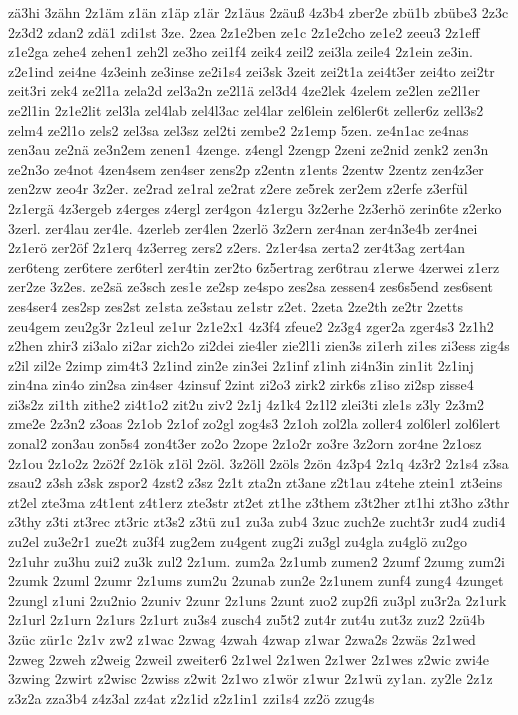 {zä3hi
3zähn
2z1äm
z1än
z1äp
z1är
2z1äus
2zäuß
4z3b4
zber2e
zbü1b
zbübe3
2z3c
2z3d2
zdan2
zdä1
zdi1st
3ze.
2zea
2z1e2ben
ze1c
2z1e2cho
ze1e2
zeeu3
2z1eff
z1e2ga
zehe4
zehen1
zeh2l
ze3ho
zei1f4
zeik4
zeil2
zei3la
zeile4
2z1ein
ze3in.
z2e1ind
zei4ne
4z3einh
ze3inse
ze2i1s4
zei3sk
3zeit
zei2t1a
zei4t3er
zei4to
zei2tr
zeit3ri
zek4
ze2l1a
zela2d
zel3a2n
ze2l1ä
zel3d4
4ze2lek
4zelem
ze2len
ze2l1er
ze2l1in
2z1e2lit
zel3la
zel4lab
zel4l3ac
zel4lar
zel6lein
zel6ler6t
zeller6z
zell3s2
zelm4
ze2l1o
zels2
zel3sa
zel3sz
zel2ti
zembe2
2z1emp
5zen.
ze4n1ac
ze4nas
zen3au
ze2nä
ze3n2em
zenen1
4zenge.
z4engl
2zengp
2zeni
ze2nid
zenk2
zen3n
ze2n3o
ze4not
4zen4sem
zen4ser
zens2p
z2entn
z1ents
2zentw
2zentz
zen4z3er
zen2zw
zeo4r
3z2er.
ze2rad
ze1ral
ze2rat
z2ere
ze5rek
zer2em
z2erfe
z3erfül
2z1ergä
4z3ergeb
z4erges
z4ergl
zer4gon
4z1ergu
3z2erhe
2z3erhö
zerin6te
z2erko
3zerl.
zer4lau
zer4le.
4zerleb
zer4len
2zerlö
3z2ern
zer4nan
zer4n3e4b
zer4nei
2z1erö
zer2öf
2z1erq
4z3erreg
zers2
z2ers.
2z1er4sa
zerta2
zer4t3ag
zert4an
zer6teng
zer6tere
zer6terl
zer4tin
zer2to
6z5ertrag
zer6trau
z1erwe
4zerwei
z1erz
zer2ze
3z2es.
ze2sä
ze3sch
zes1e
ze2sp
ze4spo
zes2sa
zessen4
zes6s5end
zes6sent
zes4ser4
zes2sp
zes2st
ze1sta
ze3stau
ze1str
z2et.
2zeta
2ze2th
ze2tr
2zetts
zeu4gem
zeu2g3r
2z1eul
ze1ur
2z1e2x1
4z3f4
zfeue2
2z3g4
zger2a
zger4s3
2z1h2
z2hen
zhir3
zi3alo
zi2ar
zich2o
zi2dei
zie4ler
zie2l1i
zien3s
zi1erh
zi1es
zi3ess
zig4s
z2il
zil2e
2zimp
zim4t3
2z1ind
zin2e
zin3ei
2z1inf
z1inh
zi4n3in
zin1it
2z1inj
zin4na
zin4o
zin2sa
zin4ser
4zinsuf
2zint
zi2o3
zirk2
zirk6s
z1iso
zi2sp
zisse4
zi3s2z
zi1th
zithe2
zi4t1o2
zit2u
ziv2
2z1j
4z1k4
2z1l2
zlei3ti
zle1s
z3ly
2z3m2
zme2e
2z3n2
z3oas
2z1ob
2z1of
zo2gl
zog4s3
2z1oh
zol2la
zoller4
zol6lerl
zol6lert
zonal2
zon3au
zon5s4
zon4t3er
zo2o
2zope
2z1o2r
zo3re
3z2orn
zor4ne
2z1osz
2z1ou
2z1o2z
2zö2f
2z1ök
z1öl
2zöl.
3z2öll
2zöls
2zön
4z3p4
2z1q
4z3r2
2z1s4
z3sa
zsau2
z3sh
z3sk
zspor2
4zst2
z3sz
2z1t
zta2n
zt3ane
z2t1au
z4tehe
ztein1
zt3eins
zt2el
zte3ma
z4t1ent
z4t1erz
zte3str
zt2et
zt1he
z3them
z3t2her
zt1hi
zt3ho
z3thr
z3thy
z3ti
zt3rec
zt3ric
zt3s2
z3tü
zu1
zu3a
zub4
3zuc
zuch2e
zucht3r
zud4
zudi4
zu2el
zu3e2r1
zue2t
zu3f4
zug2em
zu4gent
zug2i
zu3gl
zu4gla
zu4glö
zu2go
2z1uhr
zu3hu
zui2
zu3k
zul2
2z1um.
zum2a
2z1umb
zumen2
2zumf
2zumg
zum2i
2zumk
2zuml
2zumr
2z1ums
zum2u
2zunab
zun2e
2z1unem
zunf4
zung4
4zunget
2zungl
z1uni
2zu2nio
2zuniv
2zunr
2z1uns
2zunt
zuo2
zup2fi
zu3pl
zu3r2a
2z1urk
2z1url
2z1urn
2z1urs
2z1urt
zu3s4
zusch4
zu5t2
zut4r
zut4u
zut3z
zuz2
2zü4b
3züc
zür1c
2z1v
zw2
z1wac
2zwag
4zwah
4zwap
z1war
2zwa2s
2zwäs
2z1wed
2zweg
2zweh
z2weig
2zweil
zweiter6
2z1wel
2z1wen
2z1wer
2z1wes
z2wic
zwi4e
3zwing
2zwirt
z2wisc
2zwiss
z2wit
2z1wo
z1wör
z1wur
2z1wü
zy1an.
zy2le
2z1z
z3z2a
zza3b4
z4z3al
zz4at
z2z1id
z2z1in1
zzi1s4
zz2ö
zzug4s
}

\endinput

